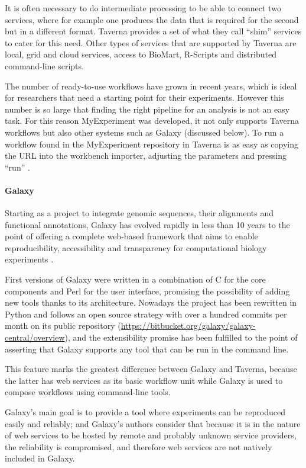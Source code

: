 It is often necessary to do intermediate processing to be able to connect two services, where for example one produces the data that is required for the second but in a different format. Taverna provides a set of what they call ``shim'' services to cater for this need. Other types of services that are supported by Taverna are local, grid and cloud services, access to BioMart, R-Scripts and distributed command-line scripts.

The number of ready-to-use workflows have grown in recent years, which is ideal for researchers that need a starting point for their experiments. However this number is so large that finding the right pipeline for an analysis is not an easy task. For this reason MyExperiment was developed, it not only supports Taverna workflows but also other systems such as Galaxy (discussed below). To run a workflow found in the MyExperiment repository in Taverna is as easy as copying the URL into the workbench importer, adjusting the parameters and pressing ``run'' \cite{WOL2013}.

\paragraph{Galaxy}
Starting as a project to integrate genomic sequences, their alignments and functional annotations, Galaxy has evolved rapidly in less than 10 years to the point of offering a complete web-based framework that aims to enable reproducibility, accessibility and transparency for computational biology experiments \cite{GIA2005, GOE2010}.

First versions of Galaxy were written in a combination of C for the core components and Perl for the user interface, promising the possibility of adding new tools thanks to its architecture. Nowadays the project has been rewritten in Python and follows an open source strategy with over a hundred commits per month on its public repository (\url{https://bitbucket.org/galaxy/galaxy-central/overview}), and the extensibility promise has been fulfilled to the point of asserting that Galaxy supports any tool that can be run in the command line.

This feature marks the greatest difference between Galaxy and Taverna, because the latter has web services as its basic workflow unit while Galaxy is used to compose workflows using command-line tools.

Galaxy's main goal is to provide a tool where experiments can be reproduced easily and reliably; and Galaxy's authors consider that because it is in the nature of web services to be hosted by remote and probably unknown service providers, the reliability is compromised, and therefore web services are not natively included in Galaxy.

